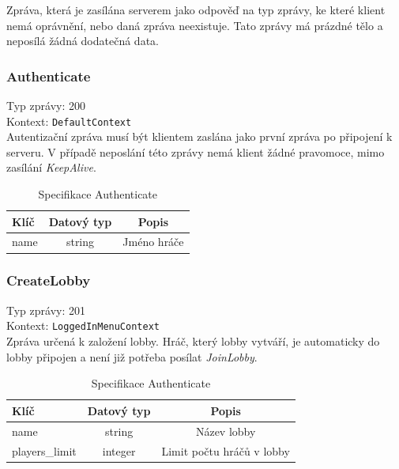 \documentclass[12pt, a4paper]{article}
\begin{document}
    Zpráva, která je zasílána serverem jako odpověď na typ zprávy, ke které klient nemá oprávnění, nebo daná zpráva neexistuje.
    Tato zprávy má prázdné tělo a neposílá žádná dodatečná data.

    \subsubsection*{Authenticate}
    Typ zprávy: 200\\
    Kontext: \texttt{DefaultContext}\\

    Autentizační zpráva musí být klientem zaslána jako první zpráva po připojení k serveru.
    V případě neposlání této zprávy nemá klient žádné pravomoce, mimo zasílání \textit{KeepAlive}.

    \begin{table}[H]
        \centering
        \begin{tabular}{|l|c|c|}
            \hline
            Klíč & Datový typ & Popis\\
            \hline
            \hline
            name & string & Jméno hráče\\
            \hline
        \end{tabular}
        \caption{Specifikace Authenticate}
    \end{table}

    \subsubsection*{CreateLobby}
    Typ zprávy: 201\\
    Kontext: \texttt{LoggedInMenuContext}\\

    Zpráva určená k založení lobby.
    Hráč, který lobby vytváří, je automaticky do lobby připojen a není již potřeba posílat \textit{JoinLobby}.

    \begin{table}[H]
        \centering
        \begin{tabular}{|l|c|c|}
            \hline
            Klíč & Datový typ & Popis\\
            \hline
            \hline
            name & string & Název lobby\\
            \hline
            players\_limit & integer & Limit počtu hráčů v lobby\\
            \hline
        \end{tabular}
        \caption{Specifikace Authenticate}
    \end{table}
\end{document}
